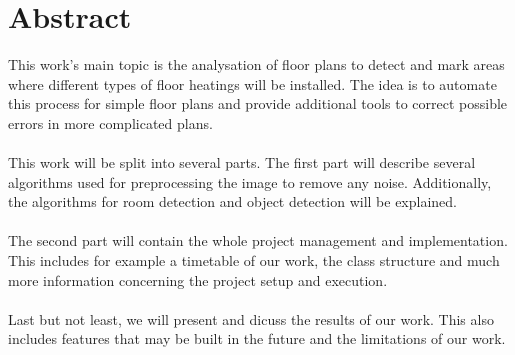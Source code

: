 \section{Abstract}
This work's main topic is the analysation of floor plans to detect and mark areas where different types of floor heatings will be installed. The idea is to automate this process for simple floor plans and provide additional tools to correct possible errors in more complicated plans.
\\\\
This work will be split into several parts. The first part will describe several algorithms used for preprocessing the image to remove any noise. Additionally, the algorithms for room detection and object detection will be explained.
\\\\
The second part will contain the whole project management and implementation. This includes for example a timetable of our work, the class structure and much more information concerning the project setup and execution.
\\\\
Last but not least, we will present and dicuss the results of our work. This also includes features that may be built in the future and the limitations of our work.